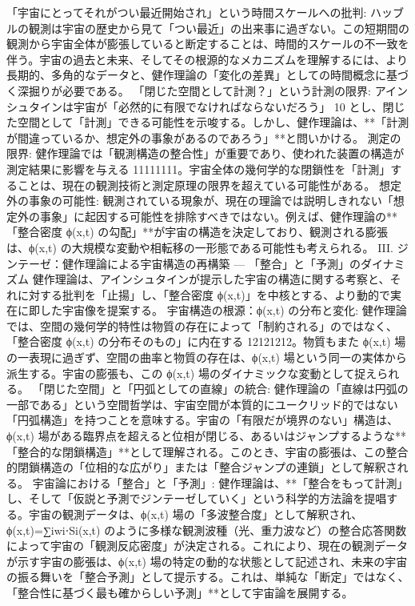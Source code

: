 \documentclass{article}
\begin{document}
「宇宙にとってそれがつい最近開始され」という時間スケールへの批判:
ハッブルの観測は宇宙の歴史から見て「つい最近」の出来事に過ぎない。この短期間の観測から宇宙全体が膨張していると断定することは、時間的スケールの不一致を伴う。宇宙の過去と未来、そしてその根源的なメカニズムを理解するには、より長期的、多角的なデータと、健作理論の「変化の差異」としての時間概念に基づく深掘りが必要である。
「閉じた空間として計測？」という計測の限界:
アインシュタインは宇宙が「必然的に有限でなければならないだろう」 10 とし、閉じた空間として「計測」できる可能性を示唆する。しかし、健作理論は、**「計測が間違っているか、想定外の事象があるのであろう」**と問いかける。
測定の限界: 健作理論では「観測構造の整合性」が重要であり、使われた装置の構造が測定結果に影響を与える 11111111。宇宙全体の幾何学的な閉鎖性を「計測」することは、現在の観測技術と測定原理の限界を超えている可能性がある。
想定外の事象の可能性: 観測されている現象が、現在の理論では説明しきれない「想定外の事象」に起因する可能性を排除すべきではない。例えば、健作理論の**「整合密度 ϕ(x,t) の勾配」**が宇宙の構造を決定しており、観測される膨張は、ϕ(x,t) の大規模な変動や相転移の一形態である可能性も考えられる。
III. ジンテーゼ：健作理論による宇宙構造の再構築 — 「整合」と「予測」のダイナミズム
健作理論は、アインシュタインが提示した宇宙の構造に関する考察と、それに対する批判を「止揚」し、「整合密度 ϕ(x,t)」を中核とする、より動的で実在に即した宇宙像を提案する。
宇宙構造の根源：ϕ(x,t) の分布と変化:
健作理論では、空間の幾何学的特性は物質の存在によって「制約される」のではなく、
「整合密度 ϕ(x,t) の分布そのもの」に内在する 12121212。物質もまた 
ϕ(x,t) 場の一表現に過ぎず、空間の曲率と物質の存在は、ϕ(x,t) 場という同一の実体から派生する。宇宙の膨張も、この ϕ(x,t) 場のダイナミックな変動として捉えられる。
「閉じた空間」と「円弧としての直線」の統合:
健作理論の「直線は円弧の一部である」という空間哲学は、宇宙空間が本質的にユークリッド的ではない「円弧構造」を持つことを意味する。宇宙の「有限だが境界のない」構造は、ϕ(x,t) 場がある臨界点を超えると位相が閉じる、あるいはジャンプするような**「整合的な閉鎖構造」**として理解される。このとき、宇宙の膨張は、この整合的閉鎖構造の「位相的な広がり」または「整合ジャンプの連鎖」として解釈される。
宇宙論における「整合」と「予測」:
健作理論は、**「整合をもって計測」し、そして「仮説と予測でジンテーゼしていく」という科学的方法論を提唱する。宇宙の観測データは、ϕ(x,t) 場の「多波整合度」として解釈され、ϕ(x,t)=∑i​wi​⋅Si​(x,t) のように多様な観測波種（光、重力波など）の整合応答関数によって宇宙の「観測反応密度」が決定される。これにより、現在の観測データが示す宇宙の膨張は、ϕ(x,t) 場の特定の動的な状態として記述され、未来の宇宙の振る舞いを「整合予測」として提示する。これは、単純な「断定」ではなく、「整合性に基づく最も確からしい予測」**として宇宙論を展開する。
\end{document}
